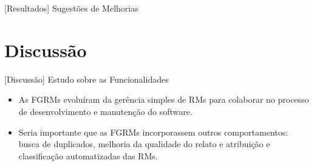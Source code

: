 \documentclass[t,14pt,mathserif]{beamer}
\begin{document}
\begin{frame}{[Resultados] Sugestões de Melhorias}

\begin{table}[htpb]
\centering
{}
\caption{Ordenamento das sugestões pelo grau de dificuldade.}
\label{tab:ranking_implementacao_sug_melhorias}
\end{table}

\end{frame}

\section{Discussão}

\begin{frame}{[Discussão] Estudo sobre as Funcionalidades}
    \begin{itemize}

        \item As FGRMs evoluíram da gerência simples de RMs para colaborar no
            processo de desenvolvimento e manutenção do software.

        \item Seria importante que as FGRMs incorporassem outros comportamentos:
              busca de duplicados, melhoria da qualidade do relato e atribuição
              e classificação automatizadas das RMs.

    \end{itemize}
\end{frame}
\end{document}
